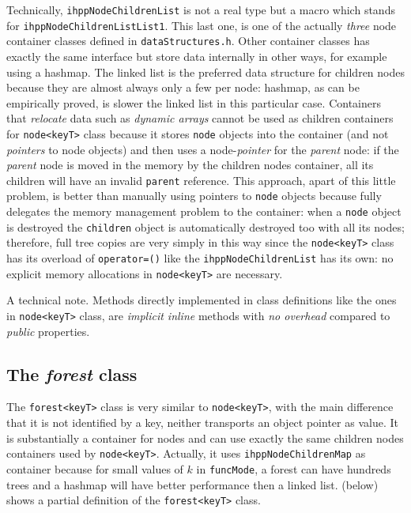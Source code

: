 \documentclass[a4paper,10pt]{report}
\begin{document}
\noindent
Technically, \verb|ihppNodeChildrenList| is not a real type but a macro which
stands for \verb|ihppNodeChildrenListList1|.
This last one, is one of the actually \emph{three} node container
classes defined in \verb|dataStructures.h|. Other container classes
has exactly the same interface but store data internally in other ways,
for example using a hashmap. The linked list is the preferred data structure
for children nodes because they are almost always only a few per node:
hashmap, as can be empirically proved, is slower the linked list
in this particular case. Containers that \emph{relocate} data
such as \emph{dynamic arrays} cannot be used as children containers for \verb|node<keyT>|
class because it stores \verb|node| objects into the container (and not \emph{pointers} to node objects) and then uses a node-\emph{pointer} for the \emph{parent} node:
if the \emph{parent} node is moved in the memory by the children nodes container,
all its children will have an invalid \verb|parent| reference.
This approach, apart of this little problem, is better than manually using pointers
to \verb|node| objects because fully delegates the memory management problem to the container: when a \verb|node| object is destroyed the \verb|children| object
is automatically destroyed too with all its nodes; therefore, full tree copies
are very simply in this way since the \verb|node<keyT>| class has its
overload of \verb|operator=()| like the \verb|ihppNodeChildrenList| has its own:
no explicit memory allocations in \verb|node<keyT>| are necessary.

A technical note. Methods directly implemented in class definitions like
the ones in \verb|node<keyT>| class, are \emph{implicit inline} methods with
\emph{no overhead} compared to \emph{public} properties.

\subsection{The \emph{forest} class}

The \verb|forest<keyT>| class is very similar to \verb|node<keyT>|, with
the main difference that it is not identified by a key, neither transports
an object pointer as value. It is substantially a container
for nodes and can use exactly the same children nodes containers used by \verb|node<keyT>|. Actually, it uses \verb|ihppNodeChildrenMap| as container because for small values
of $k$ in \verb|funcMode|, a forest can have hundreds trees and a hashmap will have
better performance then a linked list.
 (below) shows a partial definition of the \verb|forest<keyT>| class.
\vspace{0.5cm}
\end{document}
